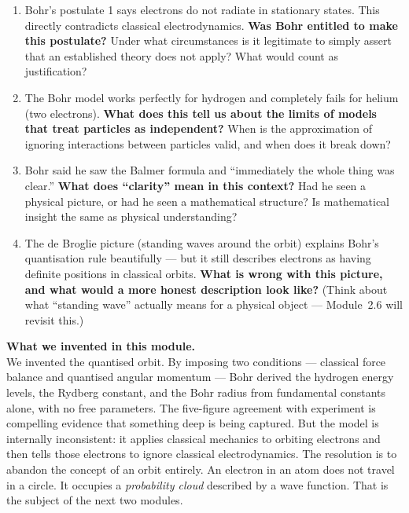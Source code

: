 \documentclass[12pt, a4paper]{book}
\begin{document}
\begin{reflectionbox}
\begin{enumerate}[label=\textbf{R\arabic*.}]
  \item Bohr's postulate 1 says electrons do not radiate
        in stationary states.
        This directly contradicts classical electrodynamics.
        \textbf{Was Bohr entitled to make this postulate?}
        Under what circumstances is it legitimate to simply
        assert that an established theory does not apply?
        What would count as justification?

  \item The Bohr model works perfectly for hydrogen and
        completely fails for helium (two electrons).
        \textbf{What does this tell us about the limits of
        models that treat particles as independent?}
        When is the approximation of ignoring interactions
        between particles valid, and when does it break down?

  \item Bohr said he saw the Balmer formula and ``immediately
        the whole thing was clear.''
        \textbf{What does ``clarity'' mean in this context?}
        Had he seen a physical picture, or had he seen a
        mathematical structure?
        Is mathematical insight the same as physical understanding?

  \item The de Broglie picture (standing waves around the orbit)
        explains Bohr's quantisation rule beautifully ---
        but it still describes electrons as having definite
        positions in classical orbits.
        \textbf{What is wrong with this picture,
        and what would a more honest description look like?}
        (Think about what ``standing wave'' actually means
        for a physical object --- Module~2.6 will revisit this.)
\end{enumerate}
\end{reflectionbox}

\vspace{1.5em}
\begin{center}
\begin{tcolorbox}[enhanced, colback=DiscoveryColor!8, colframe=DiscoveryColor,
  width=0.88\textwidth, arc=3pt]
\centering\sffamily\small
\textbf{What we invented in this module.}\\[4pt]
We invented the quantised orbit.
By imposing two conditions --- classical force balance and
quantised angular momentum --- Bohr derived the hydrogen energy
levels, the Rydberg constant, and the Bohr radius from
fundamental constants alone, with no free parameters.
The five-figure agreement with experiment is compelling evidence
that something deep is being captured.
But the model is internally inconsistent: it applies classical
mechanics to orbiting electrons and then tells those electrons
to ignore classical electrodynamics.
The resolution is to abandon the concept of an orbit entirely.
An electron in an atom does not travel in a circle.
It occupies a \emph{probability cloud} described by a wave function.
That is the subject of the next two modules.
\end{tcolorbox}
\end{center}
\end{document}
